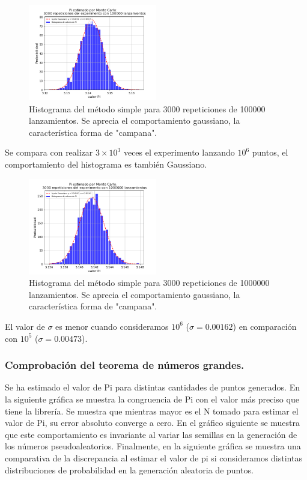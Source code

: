 \documentclass{rbf}
\begin{document}
\begin{figure}[tbp!]
 \centering
  \includegraphics[width=0.5\textwidth]{figures/MCn1e5m3000.png}
	\caption{Histograma del método simple para 3000 repeticiones de 100000 lanzamientos. Se aprecia el comportamiento gaussiano, la característica forma de "campana".}
 \label{buff2}
\end{figure}
Se compara con realizar $3×10^3$ veces el experimento lanzando $10^6$ puntos, el comportamiento del histograma es también Gaussiano.
\begin{figure}[tbp!]
 \centering
  \includegraphics[width=0.5\textwidth]{figures/MCn1e6m3000.png}
	\caption{Histograma del método simple para 3000 repeticiones de 1000000 lanzamientos. Se aprecia el comportamiento gaussiano, la característica forma de "campana".}
 \label{buff3}
\end{figure}

El valor de $\sigma$ es menor cuando consideramos $10^6$ ($\sigma=0.00162$) en comparación con $10^5$ ($\sigma=0.00473$). 
\subsubsection{Comprobación del teorema de números grandes.}
Se ha estimado el valor de Pi para distintas cantidades de puntos generados. En la siguiente gráfica se muestra la congruencia de Pi con el valor más preciso que tiene la librería. Se muestra que mientras mayor es el N tomado para estimar el valor de Pi, su error absoluto converge a cero.
En el gráfico siguiente se muestra que este comportamiento es invariante al variar las semillas en la generación de los números pseudoaleatorios.
Finalmente, en la siguiente gráfica se muestra una comparativa de la discrepancia al estimar el valor de pi si consideramos distintas distribuciones de probabilidad en la generación aleatoria de puntos.
\end{document}
